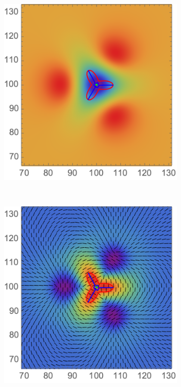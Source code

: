 \documentclass[a4paper, 11pt]{article}
\begin{document}
\begin{figure}
\centering
\begin{subfigure}[b]{0.32\textwidth}
\includegraphics[width=\textwidth]{Elliptic_mean_Phi}
\end{subfigure}~
\begin{subfigure}[b]{0.32\textwidth}
\includegraphics[width=\textwidth]{Elliptic_mean_L}

\end{subfigure}
\end{figure}
\end{document}
